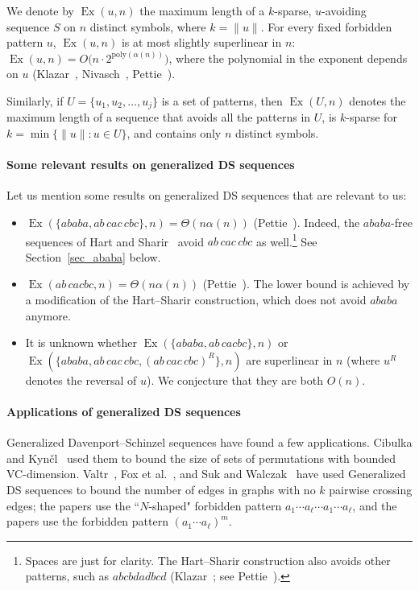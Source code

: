 \documentclass[11pt]{article}
\DeclareMathOperator{\Ex}{Ex}
\theoremstyle{definition}
\theoremstyle{remark}
\begin{document}
We denote by $\Ex(u, n)$ the maximum length of a $k$-sparse, $u$-avoiding sequence $S$ on $n$ distinct symbols, where $k=\|u\|$. For every fixed forbidden pattern $u$, $\Ex(u,n)$ is at most slightly superlinear in $n$: $\Ex(u,n) =  O\bigl(n\cdot 2^{\mathrm{poly}(\alpha(n))}\bigr)$, where the polynomial in the exponent depends on $u$ (Klazar~\cite{klazar_genDS}, Nivasch~\cite{yo_DS}, Pettie~\cite{pettie_3}).

Similarly, if $U = \{u_1, u_2, \ldots, u_j\}$ is a set of patterns, then $\Ex(U, n)$ denotes the maximum length of a sequence that avoids all the patterns in $U$, is $k$-sparse for $k = \min\{\|u\| : u\in U\}$, and contains only $n$ distinct symbols.

\paragraph{Some relevant results on generalized DS sequences}
Let us mention some results on generalized DS sequences that are relevant to us:
\begin{itemize}
\item $\Ex(\{ababa, ab\,cac\,cbc\}, n) = \Theta(n\alpha(n))$ (Pettie~\cite{pettie_origins}). Indeed, the $ababa$-free sequences of Hart and Sharir~\cite{HS} avoid $ab\,cac\,cbc$ as well.\footnote{Spaces are just for clarity. The Hart--Sharir construction also avoids other patterns, such as $abcbdadbcd$ (Klazar~\cite{klazar_93}; see Pettie~\cite{pettie_origins}).} See Section~\ref{sec_ababa} below.

\item $\Ex(ab\,cacbc, n) = \Theta(n\alpha(n))$ (Pettie~\cite{pettie_matrix}). The lower bound is achieved by a modification of the Hart--Sharir construction, which does not avoid $ababa$ anymore.

\item It is unknown whether $\Ex(\{ababa, ab\,cacbc\},n)$ or $\Ex(\{ababa, ab\,cac\,cbc, (ab\,cac\,cbc)^R\}, n)$ are superlinear in $n$ (where $u^R$ denotes the reversal of $u$). We conjecture that they are both $O(n)$.
\end{itemize}

\paragraph{Applications of generalized DS sequences}
Generalized Davenport--Schinzel sequences have found a few applications. Cibulka and Kyn\v cl~\cite{CK} used them to bound the size of sets of permutations with bounded VC-dimension. Valtr~\cite{valtr}, Fox et al.~\cite{FPS}, and Suk and Walczak~\cite{Suk-W} have used Generalized DS sequences to bound the number of edges in graphs with no $k$ pairwise crossing edges; the papers \cite{valtr,FPS} use the ``$N$-shaped" forbidden pattern $a_1\cdots a_\ell\cdots a_1\cdots a_\ell$, and the papers \cite{FPS,Suk-W} use the forbidden pattern $(a_1\cdots a_\ell)^m$.
\end{document}
